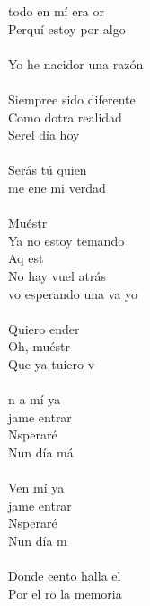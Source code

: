 \begin{cancion}
	todo en mí era or      \\
	Perquí estoy por algo  \\
	\jump\\
	Yo he nacidor una razón\\
	\jump\\
	Siempree sido diferente	\\
	Como dotra realidad\\
	Serel día hoy\\
	\jump\\
Serás tú quien\\
	me ene mi verdad  \\
	\jump\\
	Muéstr   \\
	Ya no estoy temando\\
	Aq est\\
	No hay vuel atrás\\
	vo esperando una va yo\\
	\jump\\
	Quiero ender       \\
	Oh, muéstr   \\
	Que ya tuiero v\\
	\jump\\
	n a mí ya\\
	jame entrar \\
	Nsperaré\\
	Nun día má\\
	\jump\\
	Ven mí ya\\
	jame entrar \\
	Nsperaré\\
	Nun día m         \\
	\jump\\
	Donde eento halla el\\
	Por el ro la memoria\\

\end{cancion}
